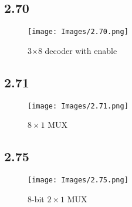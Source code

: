 \subsection*{2.70}
\begin{figure}[!ht]
    \centering
    \texttt{[image: Images/2.70.png]}
    \caption{3$\times$8 decoder with enable }
\end{figure}

\clearpage
\subsection*{2.71}
\begin{figure}[!ht]
    \centering
    \texttt{[image: Images/2.71.png]}
    \caption{$8\times1$ MUX}
\end{figure}

\clearpage
\subsection*{2.75}
\begin{figure}[!ht]
    \centering
    \texttt{[image: Images/2.75.png]}
    \caption{8-bit $2\times1$ MUX}
\end{figure}
